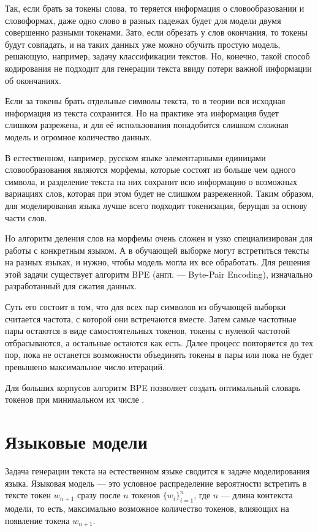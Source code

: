 Так, если брать за токены слова, то теряется информация о словообразовании и словоформах, даже одно слово в разных падежах будет для модели двумя совершенно разными токенами. Зато, если обрезать у слов окончания, то токены будут совпадать, и на таких данных уже можно обучить простую модель, решающую, например, задачу классификации текстов. Но, конечно, такой способ кодирования не подходит для генерации текста ввиду потери важной информации об окончаниях.

Если за токены брать отдельные символы текста, то в теории вся исходная информация из текста сохранится. Но на практике эта информация будет слишком разрежена, и для её использования понадобится слишком сложная модель и огромное количество данных.

В естественном, например, русском языке элементарными единицами словообразования являются морфемы, которые состоят из больше чем одного символа, и разделение текста на них сохранит всю информацию о возможных вариациях слов, которая при этом будет не слишком разреженной. Таким образом, для моделирования языка лучше всего подходит токенизация, берущая за основу части слов.

Но алгоритм деления слов на морфемы очень сложен и узко специализирован для работы с конкретным языком. А в обучающей выборке могут встретиться тексты на разных языках, и нужно, чтобы модель могла их все обработать. Для решения этой задачи существует алгоритм BPE (англ. --- Byte-Pair Encoding), изначально разработанный для сжатия данных.

Суть его состоит в том, что для всех пар символов из обучающей выборки считается частота, с которой они встречаются вместе. Затем самые частотные пары остаются в виде самостоятельных токенов, токены с нулевой частотой отбрасываются, а остальные остаются как есть. Далее процесс повторяется до тех пор, пока не останется возможности объединять токены в пары или пока не будет превышено максимальное число итераций.

Для больших корпусов алгоритм BPE позволяет создать оптимальный словарь токенов при минимальном их числе \cite{art:bpe}.

\section{Языковые модели}

Задача генерации текста на естественном языке сводится к задаче моделирования языка. Языковая модель --- это условное распределение вероятности встретить в тексте токен $w_{n+1}$ сразу после $n$ токенов $\{w_i\}_{i=1}^n$, где $n$ --- длина контекста модели, то есть, максимально возможное количество токенов, влияющих на появление токена $w_{n+1}$.


